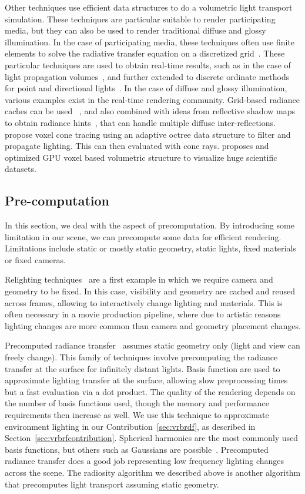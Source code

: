 Other techniques use efficient data structures to do a volumetric light transport simulation. These techniques are particular suitable to render participating media, but they can also be used to render traditional diffuse and glossy illumination. In the case of participating media, these techniques often use finite elements to solve the radiative transfer equation on a discretized grid~\cite{Fattal2009}. These particular techniques are used to obtain real-time results, such as in the case of light propagation volumes~\cite{Kaplanyan2009,Borlum2011}, and further extended to discrete ordinate methods for point and directional lights~\cite{Elek2014}. In the case of diffuse and glossy illumination, various examples exist in the real-time rendering community. Grid-based radiance caches can be used ~\cite{Nijasure2005}, and also combined with ideas from reflective shadow maps to obtain radiance hints~\cite{Papaioannou2011, Vardis2014}, that can handle multiple diffuse inter-reflections.~\citet{Crassin2011} propose voxel cone tracing using an adaptive octree data structure to filter and propagate lighting. This can then evaluated with cone rays. \citet{Hoetzlein2016} proposes and optimized GPU voxel based volumetric structure to visualize huge scientific datasets. 

\subsection{Pre-computation}
In this section, we deal with the aspect of precomputation. By introducing some limitation in our scene, we can precompute some data for efficient rendering. Limitations include static or mostly static geometry, static lights, fixed materials or fixed cameras. 

Relighting techniques~\cite{Nimeroff94, Pellacini2005, Hasan2006} are a first example in which we require camera and geometry to be fixed. In this case, visibility and geometry are cached and reused across frames, allowing to interactively change lighting and materials. This is often necessary in a movie production pipeline, where due to artistic reasons lighting changes are more common than camera and geometry placement changes.

Precomputed radiance transfer~\cite{Sloan2002} assumes static geometry only (light and view can freely change). This family of techniques involve precomputing the radiance transfer at the surface for infinitely distant lights. Basis function are used to approximate lighting transfer at the surface, allowing slow preprocessing times but a fast evaluation via a dot product. The quality of the rendering depends on the number of basis functions used, though the memory and performance requirements then increase as well. We use this technique to approximate environment lighting in our Contribution~\ref{sec:vrbrdf}, as described in Section~\ref{sec:vrbrfcontribution}. Spherical harmonics are the most commonly used basis functions, but others such as Gaussians are possible~\cite{Green2006}. Precomputed radiance transfer does a good job representing low frequency lighting changes across the scene. The radiosity algorithm we described above is another algorithm that precomputes light transport assuming static geometry.

